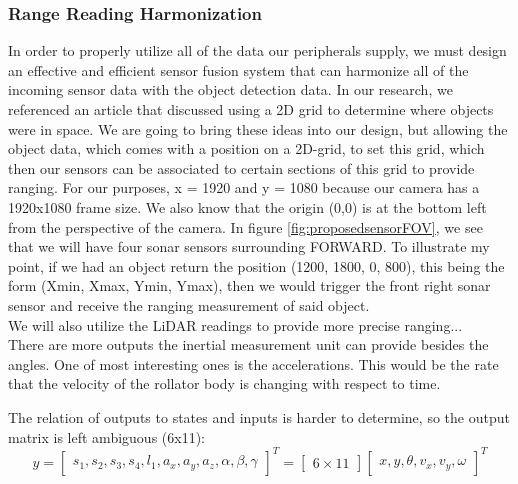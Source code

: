 \subsubsection{Range Reading Harmonization}
\noindent In order to properly utilize all of the data our peripherals supply, we must design an effective and efficient sensor fusion system that can harmonize all of the incoming sensor data with the object detection data. In our research, we referenced an article \cite{CVRef2} that discussed using a 2D grid to determine where objects were in space. We are going to bring these ideas into our design, but allowing the object data, which comes with a position on a 2D-grid, to set this grid, which then our sensors can be associated to certain sections of this grid to provide ranging. For our purposes, x = 1920 and y = 1080 because our camera has a 1920x1080 frame size. We also know that the origin (0,0) is at the bottom left from the perspective of the camera. In figure \ref{fig:proposedsensorFOV}, we see that we will have four sonar sensors surrounding FORWARD. To illustrate my point, if we had an object return the position (1200, 1800, 0, 800), this being the form (Xmin, Xmax, Ymin, Ymax), then we would trigger the front right sonar sensor and receive the ranging measurement of said object. \\

\noindent We will also utilize the LiDAR readings to provide more precise ranging... \\

\noindent There are more outputs the inertial measurement unit can provide besides the angles. One of most interesting ones is the accelerations. This would be the rate that the velocity of the rollator body is changing with respect to time. 

\noindent The relation of outputs to states and inputs is harder to determine, so the output matrix is left ambiguous (6x11):
\[y =
\begin{bmatrix}
	s_1, s_2, s_3, s_4, l_1, a_x, a_y, a_z, \alpha, \beta, \gamma
\end{bmatrix}^T = 
\begin{bmatrix}
	6\times 11
\end{bmatrix}
\begin{bmatrix}
	x, y, \theta, v_x, v_y, \omega
\end{bmatrix}^T
\]



